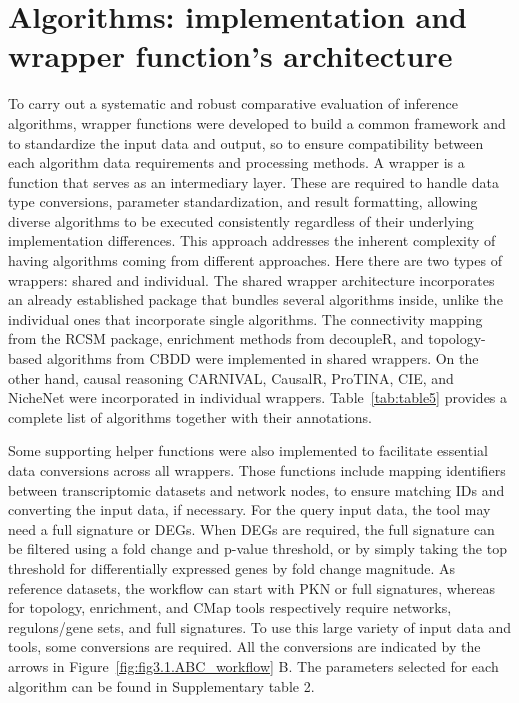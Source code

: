 \section{Algorithms: implementation and wrapper function's architecture} %
\label{sec:algorithms}

To carry out a systematic and robust comparative evaluation of inference algorithms, wrapper functions were developed to build a common framework and to standardize the input data and output, so to ensure compatibility between each algorithm data requirements and processing methods. 
A wrapper is a function that serves as an intermediary layer. 
These are required to handle data type conversions, parameter standardization, and result formatting, allowing diverse algorithms to be executed consistently regardless of their underlying implementation differences. This approach addresses the inherent complexity of having algorithms coming from different approaches. Here there are two types of wrappers: shared and individual. The shared wrapper architecture incorporates an already established package that bundles several algorithms inside, unlike the individual ones that incorporate single algorithms. The connectivity mapping from the RCSM package, enrichment methods from decoupleR, and topology-based algorithms from CBDD were implemented in shared wrappers. On the other hand, causal reasoning CARNIVAL, CausalR, ProTINA, CIE, and NicheNet were incorporated in individual wrappers. Table~\ref{tab:table5} provides a complete list of algorithms together with their annotations.

Some supporting helper functions were also implemented to facilitate essential data conversions across all wrappers. Those functions include mapping identifiers between transcriptomic datasets and network nodes, to ensure matching IDs and converting the input data, if necessary. For the query input data, the tool may need a full signature or DEGs. When DEGs are required, the full signature can be filtered using a fold change and p-value threshold, or by simply taking the top threshold for differentially expressed genes by fold change magnitude. As reference datasets, the workflow can start with PKN or full signatures, whereas for topology, enrichment, and CMap tools respectively require networks, regulons/gene sets, and full signatures. To use this large variety of input data and tools, some conversions are required. All the conversions are indicated by the arrows in Figure~\ref{fig:fig3.1.ABC_workflow} B. 
The parameters selected for each algorithm can be found in Supplementary table 2.

